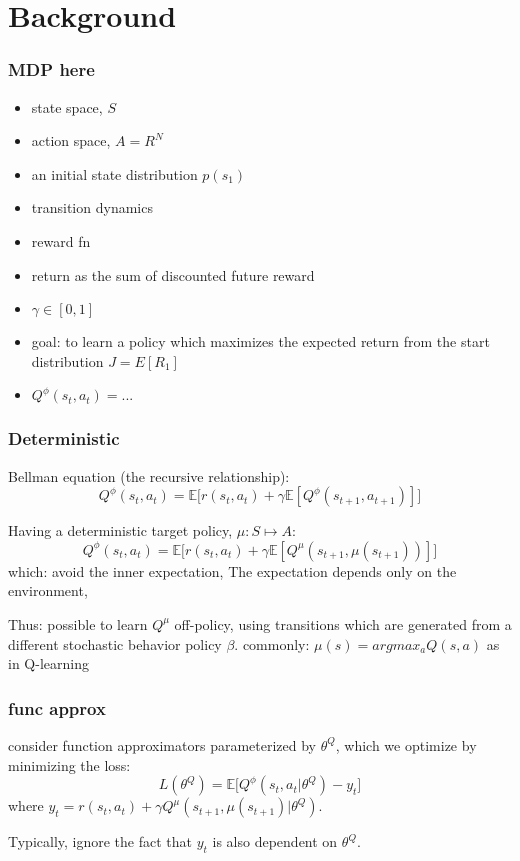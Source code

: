 \section{Background}


\begin{frame}
\frametitle{MDP here}

\begin{itemize}
  \item state space, $S$
  \item action space, $A = R^N$
  \item an initial state distribution $p(s_1)$
  \item transition dynamics
  \item reward fn
  \item return as the sum of discounted future reward
  \item $\gamma \in [0,1]$
  \item goal: to learn a policy which maximizes the expected return from
  the start distribution $J = E[R_1]$
  \item $Q^{\phi}(s_t,a_t) = ...$
\end{itemize}

\end{frame}

\begin{frame}
\frametitle{Deterministic}

Bellman equation (the recursive relationship):
\begin{equation}
Q^{\phi} (s_t,a_t) = \mathbb{E} \Big[ r(s_t,a_t) + \gamma \mathbb{E} [Q^{\phi}(s_{t+1},a_{t+1})] \Big]
\end{equation}

Having a deterministic target policy, $\mu: S \mapsto A$:
\begin{equation}
Q^{\phi} (s_t,a_t) = \mathbb{E} \Big[ r(s_t,a_t) + \gamma \mathbb{E} [Q^{\mu}(s_{t+1},\mu(s_{t+1}))] \Big]
\end{equation}
which:
avoid the inner expectation,
The expectation depends only on the environment,

Thus: possible to learn $Q^{\mu}$ off-policy,
using transitions which are generated from a different stochastic behavior policy $\beta$.
commonly: $\mu(s) = argmax_a Q(s,a)$ as in Q-learning
\end{frame}

\begin{frame}
\frametitle{func approx}
consider function approximators parameterized by $\theta^Q$, which we optimize by minimizing the loss:
\begin{equation*}
L(\theta^Q) =\mathbb{E} \Big[ Q^{\phi} (s_t,a_t|\theta^Q) - y_t \Big]
\end{equation*}
where $y_t = r(s_t,a_t) + \gamma Q^{\mu}(s_{t+1},\mu(s_{t+1}) | \theta^Q)$.

Typically, ignore the fact that $y_t$ is also dependent on $\theta^Q$.

\end{frame}


